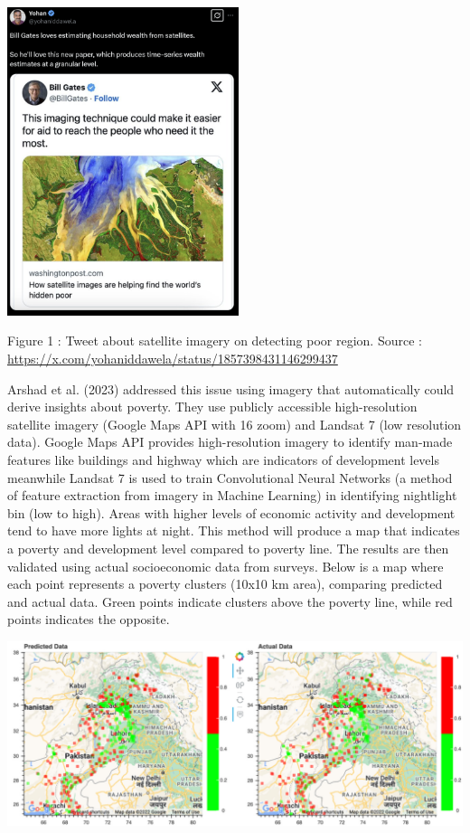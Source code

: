 \documentclass[
  letterpaper,
  DIV=11,
  numbers=noendperiod]{scrreprt}
\begin{document}
\includegraphics[width=2.66667in,height=\textheight]{images/clipboard-3275173560.png}

Figure 1 : Tweet about satellite imagery on detecting poor region.
Source : \url{https://x.com/yohaniddawela/status/1857398431146299437}

Arshad et al. (2023) addressed this issue using imagery that
automatically could derive insights about poverty. They use publicly
accessible high-resolution satellite imagery (Google Maps API with 16
zoom) and Landsat 7 (low resolution data). Google Maps API provides
high-resolution imagery to identify man-made features like buildings and
highway which are indicators of development levels meanwhile Landsat 7
is used to train Convolutional Neural Networks (a method of feature
extraction from imagery in Machine Learning) in identifying nightlight
bin (low to high). Areas with higher levels of economic activity and
development tend to have more lights at night. This method will produce
a map that indicates a poverty and development level compared to poverty
line. The results are then validated using actual socioeconomic data
from surveys. Below is a map where each point represents a poverty
clusters (10x10 km area), comparing predicted and actual data. Green
points indicate clusters above the poverty line, while red points
indicates the opposite.

\includegraphics[width=6.25in,height=\textheight]{images/clipboard-4160873008.png}
\end{document}
